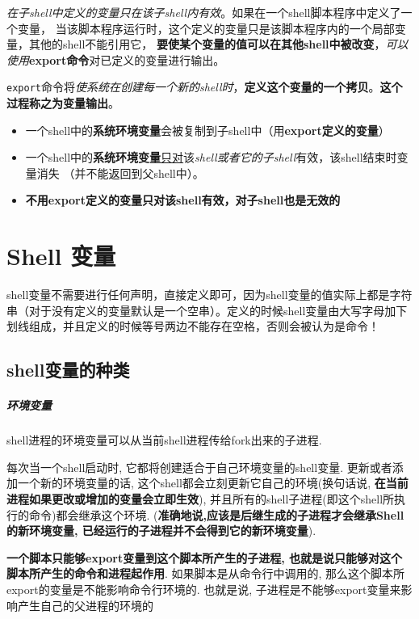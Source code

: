 \documentclass[UTF8,a4paper,12pt]{ctexbook}
\begin{document}
					\textit{在子shell中定义的变量只在该子shell内有效}。如果在一个shell脚本程序中定义了一个变量，
					当该脚本程序运行时，这个定义的变量只是该脚本程序内的一个局部变量，其他的shell不能引用它，
					\textbf{要使某个变量的值可以在其他shell中被改变}，\textit{可以使用}\textbf{export命令}对已定义的变量进行输出。
					
					
					\verb|export|命令将\textit{使系统在创建每一个新的shell时}，\textbf{定义这个变量的一个拷贝}。\textbf{这个过程称之为变量输出}。
					
					\begin{itemize}
						\item 一个shell中的\textbf{系统环境变量}会被复制到子shell中（用\textbf{export定义的变量}）
						\item 一个shell中的\textbf{系统环境变量}\underline{只对}该\textit{shell或者它的子shell}有效，该shell结束时变量消失
						（并不能返回到父shell中）。
						\item \textbf{不用export定义的变量只对该shell有效，对子shell也是无效的}
					\end{itemize}
		 \section{Shell 变量}
			 shell变量不需要进行任何声明，直接定义即可，因为shell变量的值实际上都是字符串（对于没有定义的变量默认是一个空串）。定义的时候shell变量由大写字母加下划线组成，并且定义的时候等号两边不能存在空格，否则会被认为是命令！
			 
			 \subsection{shell变量的种类}
				 \subparagraph{环境变量}
				 	shell进程的环境变量可以从当前shell进程传给fork出来的子进程.
				 	
				 	每次当一个shell启动时, 它都将创建适合于自己环境变量的shell变量. 更新或者添加一个新的环境变量的话, 这个shell都会立刻更新它自己的环境(换句话说, \textbf{在当前进程如果更改或增加的变量会立即生效}), 并且所有的shell子进程(即这个shell所执行的命令)都会继承这个环境. (\textbf{准确地说,应该是后继生成的子进程才会继承Shell的新环境变量, 已经运行的子进程并不会得到它的新环境变量}).
				 	
				 	\textbf{一个脚本只能够export变量到这个脚本所产生的子进程, 也就是说只能够对这个脚本所产生的命令和进程起作用}. 如果脚本是从命令行中调用的, 那么这个脚本所export的变量是不能影响命令行环境的. 也就是说, 子进程是不能够export变量来影响产生自己的父进程的环境的
				 	
\end{document}
